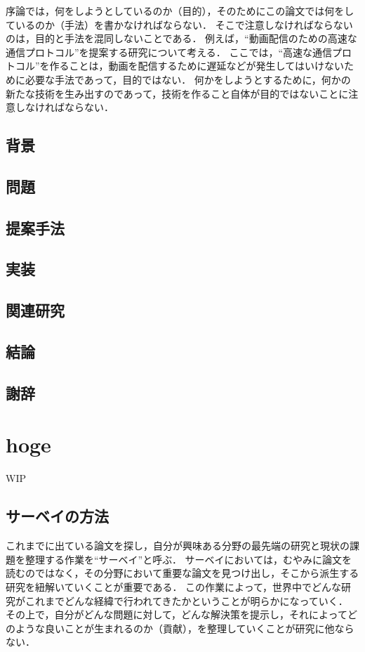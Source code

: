 序論では，何をしようとしているのか（目的），そのためにこの論文では何をしているのか（手法）を書かなければならない．
そこで注意しなければならないのは，目的と手法を混同しないことである．
例えば，``動画配信のための高速な通信プロトコル''を提案する研究について考える．
ここでは，``高速な通信プロトコル''を作ることは，動画を配信するために遅延などが発生してはいけないために必要な手法であって，目的ではない．
何かをしようとするために，何かの新たな技術を生み出すのであって，技術を作ること自体が目的ではないことに注意しなければならない．


\subsection{背景}
\subsection{問題}
\subsection{提案手法}
\subsection{実装}
\subsection{関連研究}
\subsection{結論}
\subsection{謝辞}

\section{hoge}
\label{background:process}
WIP
\subsection{サーベイの方法}
\label{backgorund:servey}
これまでに出ている論文を探し，自分が興味ある分野の最先端の研究と現状の課題を整理する作業を``サーベイ''と呼ぶ．
サーベイにおいては，むやみに論文を読むのではなく，その分野において重要な論文を見つけ出し，そこから派生する研究を紐解いていくことが重要である．
この作業によって，世界中でどんな研究がこれまでどんな経緯で行われてきたかということが明らかになっていく．
その上で，自分がどんな問題に対して，どんな解決策を提示し，それによってどのような良いことが生まれるのか（貢献），を整理していくことが研究に他ならない．

